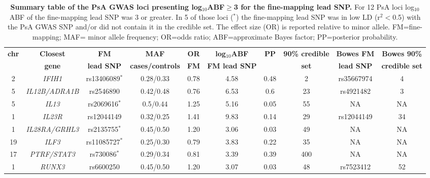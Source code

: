 \begin{landscape}
\begin{center}
\renewcommand{\arraystretch}{0.8}
\begin{longtable}[htbp]{c c c c c c c c c c}
\caption[Summary table of the PsA GWAS loci presenting log$_{10}$ABF$\geq$3 for the fine-mapping lead SNP.]{\textbf{Summary table of the PsA GWAS loci presenting log$_{10}$ABF$\geq$3 for the fine-mapping lead SNP.} For 12 PsA loci log${_10}$ABF of the fine-mapping lead SNP was 3 or greater. In 5 of those loci ($^{\ast}$) the fine-mapping lead SNP was in low LD (r$^{2}<$0.5) with the PsA GWAS SNP and/or did not contain it in the credible set. The effect size (OR) is reported relative to minor allele. FM=fine-mapping; MAF= minor allele frequency; OR=odds ratio; ABF=approximate Bayes factor; PP=posterior probability.}
\label{tab:PsA_fine_mapping_summary} \\
\toprule
\textbf{chr} & \textbf{Closest} & \textbf{FM} & \textbf{MAF} & \textbf{OR} & \textbf{log$_{10}$ABF} & \textbf{PP} & \textbf{90\% credible} &\textbf{Bowes FM} & \textbf{Bowes 90\%}\\
    & \textbf{gene} & \textbf{lead SNP} & \textbf{cases/controls} & \textbf{FM} & \textbf{FM lead SNP} &  & \textbf{set} &\textbf{lead SNP} & \textbf{credible set} \\
\midrule
\midrule
2	 &\textit{IFIH1}	       & rs13406089$^{\ast}$	&0.28/0.33	&0.78	&4.58	&0.48	&2	&rs35667974	&4 \\
5	 &\textit{IL12B/ADRA1B}  & rs2546890 	          &0.42/0.48	&0.76	&6.53	&0.6	&23	&rs4921482	&3 \\
5	 &\textit{IL13}	         &rs2069616$^{\ast}$	  &0.5/0.44	  &1.25	&5.16	&0.05	&55	&NA	 &NA \\
1	 &\textit{IL23R}	       &rs12044149	          &0.32/0.25	&1.41	&9.83	&0.14	&29	&rs12044149	&34 \\
1	 &\textit{IL28RA/GRHL3}  &rs2135755$^{\ast}$	  &0.45/0.50	&1.20	&3.06	&0.03	&49	&NA	&NA \\
19 &\textit{ILF3}	         &rs11085727$^{\ast}$	  &0.25/0.30	&0.79	&3.83	&0.22	&35	&NA	&NA \\
17 &\textit{PTRF/STAT3}    &rs730086$^{\ast}$     &0.29/0.34 &0.81 &3.39 &0.39 &400	&NA	&NA \\
1	 & \textit{RUNX3}	       & rs6600250	          &0.45/0.50	&1.20	&3.07	&0.03	&48	&rs7523412	&52 \\

\end{longtable}
\end{center}
\end{landscape}
